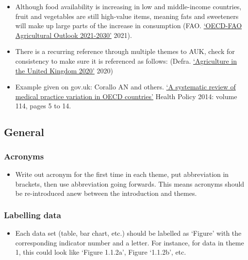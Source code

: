 \documentclass[
]{book}
\providecommand{\tightlist}{%
  \setlength{\itemsep}{0pt}\setlength{\parskip}{0pt}}
\begin{document}
\begin{itemize}
\item
  Although food availability is increasing in low and middle-income countries, fruit and vegetables are still high-value items, meaning fats and sweeteners will make up large parts of the increase in consumption (FAO. \href{https://www.fao.org/3/cb5332en/cb5332en.pdf}{`OECD-FAO Agricultural Outlook 2021-2030'} 2021).
\item
  There is a recurring reference through multiple themes to AUK, check for consistency to make sure it is referenced as follows: (Defra. \href{https://assets.publishing.service.gov.uk/government/uploads/system/uploads/attachment_data/file/1056618/AUK2020_22feb22.pdf}{`Agriculture in the United Kingdom 2020'} 2020)
\item
  Example given on gov.uk: Corallo AN and others. \href{https://www.sciencedirect.com/journal/health-policy}{`A systematic review of medical practice variation in OECD countries'} Health Policy 2014: volume 114, pages 5 to 14.
\end{itemize}

\hypertarget{general}{%
\subsection{General}\label{general}}

\hypertarget{acronyms}{%
\subsubsection{Acronyms}\label{acronyms}}

\begin{itemize}
\tightlist
\item
  Write out acronym for the first time in each theme, put abbreviation in brackets, then use abbreviation going forwards. This means acronyms should be re-introduced anew between the introduction and themes.
\end{itemize}

\hypertarget{labelling-data}{%
\subsubsection{Labelling data}\label{labelling-data}}

\begin{itemize}
\tightlist
\item
  Each data set (table, bar chart, etc.) should be labelled as `Figure' with the corresponding indicator number and a letter. For instance, for data in theme 1, this could look like `Figure 1.1.2a', Figure `1.1.2b', etc.
\end{itemize}
\end{document}
